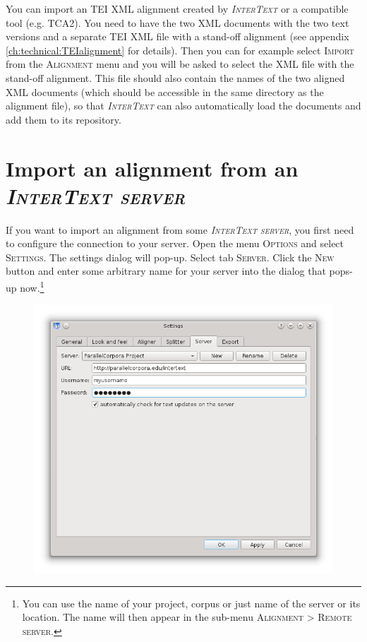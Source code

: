 \documentclass[a4paper,10pt,oneside]{book}
\newcommand{\IT}{\textit{\textsc{InterText}}\xspace}
\newcommand{\ITserver}{\textit{\textsc{InterText server}}\xspace}
\newcommand{\menu}[1]{\textsc{#1}}
\begin{document}
You can import an TEI XML alignment created by \IT or a compatible tool (e.g. TCA2). You need to have the two XML documents with the two text versions and a separate TEI XML file with a stand-off alignment (see appendix \ref{ch:technical:TEIalignment} for details). Then you can for example select \menu{Import} from the \menu{Alignment} menu and you will be asked to select the XML file with the stand-off alignment. This file should also contain the names of the two aligned XML documents (which should be accessible in the same directory as the alignment file), so that \IT can also automatically load the documents and add them to its repository.

\section{Import an alignment from an \ITserver}\label{ch:howto:importfromserver}

If you want to import an alignment from some \ITserver, you first need to configure the connection to your server. Open the menu \menu{Options} and select \menu{Settings}. The settings dialog will pop-up. Select tab \menu{Server}. Click the \menu{New} button and enter some arbitrary name for your server into the dialog that pops-up now.\footnote{You can use the name of your project, corpus or just name of the server or its location. The name will then appear in the sub-menu \menu{Alignment} > \menu{Remote server}.}

\begin{figure}[htbf]
 \includegraphics[width=\textwidth]{screenshots/settings_server.png}
\end{figure}
\end{document}

